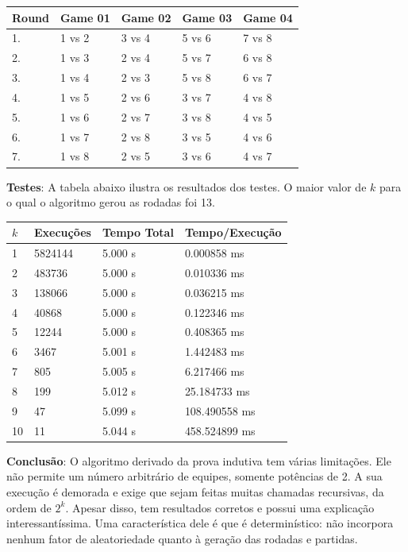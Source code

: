 \documentclass{article}
\begin{document}
\begin{table}[H]
\centering
\begin{tabular}{l|l|l|l|l}
Round & Game 01 & Game 02 & Game 03 & Game 04\\\hline
1.& 1 vs 2 & 3 vs 4 & 5 vs 6 & 7 vs 8\\
2.& 1 vs 3 & 2 vs 4 & 5 vs 7 & 6 vs 8\\
3.& 1 vs 4 & 2 vs 3 & 5 vs 8 & 6 vs 7\\
4.& 1 vs 5 & 2 vs 6 & 3 vs 7 & 4 vs 8\\
5.& 1 vs 6 & 2 vs 7 & 3 vs 8 & 4 vs 5\\
6.& 1 vs 7 & 2 vs 8 & 3 vs 5 & 4 vs 6\\
7.& 1 vs 8 & 2 vs 5 & 3 vs 6 & 4 vs 7\\
\end{tabular}
\end{table}

\textbf{Testes}: A tabela abaixo ilustra os resultados dos testes. O maior valor de $k$ para o qual o algoritmo gerou as rodadas foi 13.

\begin{table}[H]
\centering
\begin{tabular}{l|l|l|l}
$k$ & Execuções & Tempo Total & Tempo/Execução \\\hline
1 & 5824144 & 5.000 s & 0.000858 ms \\
2 & 483736 & 5.000 s & 0.010336 ms \\
3 & 138066 & 5.000 s & 0.036215 ms \\
4 & 40868 & 5.000 s & 0.122346 ms \\
5 & 12244 & 5.000 s & 0.408365 ms \\
6 & 3467 & 5.001 s & 1.442483 ms \\
7 & 805 & 5.005 s & 6.217466 ms \\
8 & 199 & 5.012 s & 25.184733 ms \\
9 & 47 & 5.099 s & 108.490558 ms \\
10 & 11 & 5.044 s & 458.524899 ms \\
\end{tabular}
\end{table}

\textbf{Conclusão}: O algoritmo derivado da prova indutiva tem várias limitações. Ele não permite um número arbitrário de equipes, somente potências de 2. A sua execução é demorada e exige que sejam feitas muitas chamadas recursivas, da ordem de $2^k$. Apesar disso, tem resultados corretos e possui uma explicação interessantíssima. Uma característica dele é que é determinístico: não incorpora nenhum fator de aleatoriedade quanto à geração das rodadas e partidas.
\end{document}
